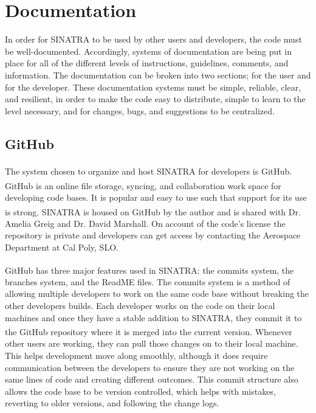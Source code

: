 \section{Documentation}
In order for SINATRA to be used by other users and developers, the code must be well-documented. Accordingly, systems of documentation are being put in place for all of the different levels of instructions, guidelines, comments, and information. The documentation  can be broken into two sections; for the user and for the developer. These documentation systems must be simple, reliable, clear, and resilient, in order to make the code easy to distribute, simple to learn to the level necessary, and for changes, bugs, and suggestions to be centralized.

\subsection{GitHub}
The system chosen to organize and host SINATRA for developers is GitHub\textsuperscript{\textregistered}. GitHub\textsuperscript{\textregistered} is an online file storage, syncing, and collaboration work space for developing code bases. It is popular and easy to use such that support for its use is strong. SINATRA is housed on GitHub\textsuperscript{\textregistered} by the author and is shared with Dr. Amelia Greig and Dr. David Marshall. On account of the code's license the repository is private and developers can get access by contacting the Aerospace Department at Cal Poly, SLO. \par
\indent GitHub\textsuperscript{\textregistered} has three major features used in SINATRA: the commits system, the branches system, and the ReadME files. The commits system is a method of allowing multiple developers to work on the same code base without breaking the other developers builds. Each developer works on the code on their local machines and once they have a stable addition to SINATRA, they commit it to the GitHub\textsuperscript{\textregistered} repository where it is merged into the current version. Whenever other users are working, they can pull those changes on to their local machine. This helps development move along smoothly, although it does require communication between the developers to ensure they are not working on the same lines of code and creating different outcomes. This commit structure also allows the code base to be version controlled, which helps with mistakes, reverting to older versions, and following the change logs. \par


